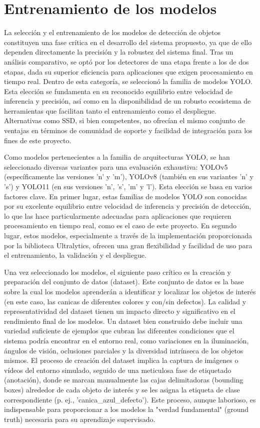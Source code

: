 \documentclass[11pt,spanish,listoffigures,listoftables]{tfgetsinf}
\begin{document}
\section{Entrenamiento de los modelos} \label{sec:entrenamiento_modelo}

La selección y el entrenamiento de los modelos de detección de objetos constituyen una fase crítica en el desarrollo del sistema propuesto, ya que de ello dependen directamente la precisión y la robustez del sistema final.
Tras un análisis comparativo, se optó por los detectores de una etapa frente a los de dos etapas, dada su superior eficiencia para aplicaciones que exigen procesamiento en tiempo real. Dentro de esta categoría, se seleccionó la familia de modelos YOLO. Esta elección se fundamenta en su reconocido equilibrio entre velocidad de inferencia y precisión, así como en la disponibilidad de un robusto ecosistema de herramientas que facilitan tanto el entrenamiento como el despliegue. Alternativas como SSD, si bien competentes, no ofrecían el mismo conjunto de ventajas en términos de comunidad de soporte y facilidad de integración para los fines de este proyecto.

Como modelos pertenecientes a la familia de arquitecturas YOLO, se han seleccionado diversas variantes para una evaluación exhaustiva: YOLOv5 (específicamente las versiones 'n' y 'm'), YOLOv8 (también en sus variantes 'n' y 's') y YOLO11 (en sus versiones 'n', 's', 'm' y 'l'). Esta elección se basa en varios factores clave. En primer lugar, estas familias de modelos YOLO son conocidas por su excelente equilibrio entre velocidad de inferencia y precisión de detección, lo que las hace particularmente adecuadas para aplicaciones que requieren procesamiento en tiempo real, como es el caso de este proyecto. En segundo lugar, estos modelos, especialmente a través de la implementación proporcionada por la biblioteca Ultralytics, ofrecen una gran flexibilidad y facilidad de uso para el entrenamiento, la validación y el despliegue.

Una vez seleccionado los modelos, el siguiente paso crítico es la creación y preparación del conjunto de datos (dataset). Este conjunto de datos es la base sobre la cual los modelos aprenderán a identificar y localizar los objetos de interés (en este caso, las canicas de diferentes colores y con/sin defectos). La calidad y representatividad del dataset tienen un impacto directo y significativo en el rendimiento final de los modelos. Un dataset bien construido debe incluir una variedad suficiente de ejemplos que cubran las diferentes condiciones que el sistema podría encontrar en el entorno real, como variaciones en la iluminación, ángulos de visión, oclusiones parciales y la diversidad intrínseca de los objetos mismos. El proceso de creación del dataset implica la captura de imágenes o vídeos del entorno simulado, seguido de una meticulosa fase de etiquetado (anotación), donde se marcan manualmente las cajas delimitadoras (bounding boxes) alrededor de cada objeto de interés y se les asigna la etiqueta de clase correspondiente (p. ej., 'canica\_azul\_defecto'). Este proceso, aunque laborioso, es indispensable para proporcionar a los modelos la "verdad fundamental" (ground truth) necesaria para su aprendizaje supervisado.
\end{document}
